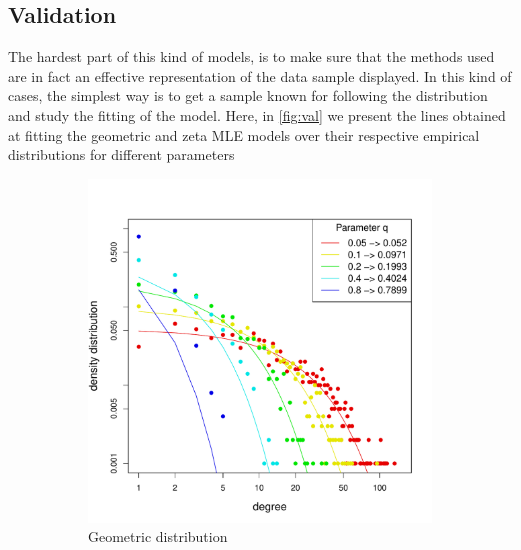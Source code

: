 \documentclass{article}
\begin{document}
\subsection*{Validation}
The hardest part of this kind of models, is to make sure that the methods used are in fact an effective representation of the data sample displayed. In this kind of cases, the simplest way is to get a sample known for following the distribution and study the fitting of the model. Here, in \ref{fig:val} we present the lines obtained at fitting the geometric and zeta MLE models over their respective empirical distributions for different parameters

\begin{figure}[!htb]
    \centering 
    \begin{subfigure}[b]{0.44\textwidth}
         \centering
         \includegraphics[width=\textwidth]{figures/geom_validation.pdf}
         \caption{Geometric distribution}
        \label{fig:geom_val}
     \end{subfigure}
     \hfill
    \begin{subfigure}[b]{0.44\textwidth}
         \centering

\end{subfigure}
\end{figure}
\end{document}
